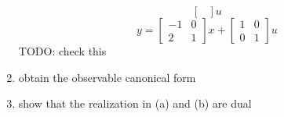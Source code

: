 \begin{enumerate}
\begin{equation}
\begin{bmatrix}
      \end{bmatrix}u
    \end{equation}
    \begin{equation}
      y =
      \begin{bmatrix}
        -1 & 0 \\
        2 & 1
      \end{bmatrix}x +
      \begin{bmatrix}
        1 & 0 \\
        0 & 1
      \end{bmatrix}u
    \end{equation}
    {\LARGE \color{red} TODO: check this}
  \item obtain the observable canonical form
  \item show that the realization in (a) and (b) are dual
  \end{enumerate}
